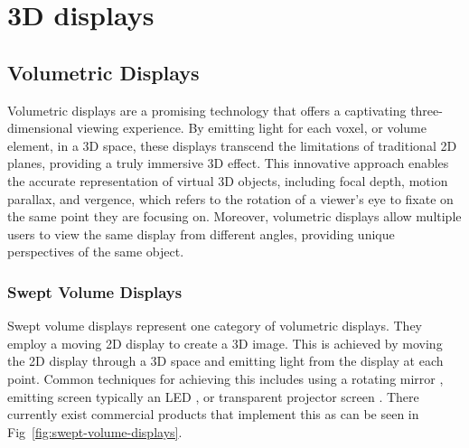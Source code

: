 \section{3D displays}

\subsection{Volumetric Displays}
Volumetric displays \cite{1492264} are a promising technology that offers a captivating three-dimensional viewing experience. By emitting light for each voxel, or volume element, in a 3D space, these displays transcend the limitations of traditional 2D planes, providing a truly immersive 3D effect. This innovative approach enables the accurate representation of virtual 3D objects, including focal depth, motion parallax, and vergence, which refers to the rotation of a viewer's eye to fixate on the same point they are focusing on. Moreover, volumetric displays allow multiple users to view the same display from different angles, providing unique perspectives of the same object. 

\subsubsection{Swept Volume Displays}
Swept volume displays represent one category of volumetric displays. They employ a moving 2D display to create a 3D image. This is achieved by moving the 2D display through a 3D space and emitting light from the display at each point. Common techniques for achieving this includes using a rotating mirror \cite{10.1117/12.480930}, emitting screen typically an LED \cite{Gately:11}, or transparent projector screen \cite{keane_volumetric_2016}. There currently exist commercial products that implement this as can be seen in Fig~\ref{fig:swept-volume-displays}.

